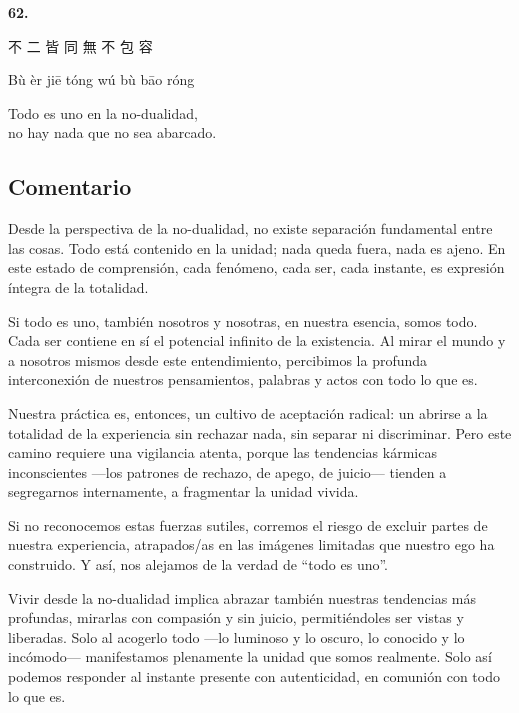 \documentclass[
  a5paperpaper,
]{article}
\begin{document}
\hfill\break

\hypertarget{02}{}
\begin{verseblock}

\newpage

\begin{center}\textbf{62.}\end{center}

不 二 皆 同 無 不 包 容

Bù èr jiē tóng wú bù bāo róng

Todo es uno en la no-dualidad,\\
no hay nada que no sea abarcado.

\end{verseblock}

\hfill\break

\hypertarget{comentario-61}{%
\subsection{Comentario}\label{comentario-61}}

Desde la perspectiva de la no-dualidad, no existe separación fundamental
entre las cosas. Todo está contenido en la unidad; nada queda fuera,
nada es ajeno. En este estado de comprensión, cada fenómeno, cada ser,
cada instante, es expresión íntegra de la totalidad.

Si todo es uno, también nosotros y nosotras, en nuestra esencia, somos
todo. Cada ser contiene en sí el potencial infinito de la existencia. Al
mirar el mundo y a nosotros mismos desde este entendimiento, percibimos
la profunda interconexión de nuestros pensamientos, palabras y actos con
todo lo que es.

Nuestra práctica es, entonces, un cultivo de aceptación radical: un
abrirse a la totalidad de la experiencia sin rechazar nada, sin separar
ni discriminar. Pero este camino requiere una vigilancia atenta, porque
las tendencias kármicas inconscientes ---los patrones de rechazo, de
apego, de juicio--- tienden a segregarnos internamente, a fragmentar la
unidad vivida.

Si no reconocemos estas fuerzas sutiles, corremos el riesgo de excluir
partes de nuestra experiencia, atrapados/as en las imágenes limitadas
que nuestro ego ha construido. Y así, nos alejamos de la verdad de
``todo es uno''.

Vivir desde la no-dualidad implica abrazar también nuestras tendencias
más profundas, mirarlas con compasión y sin juicio, permitiéndoles ser
vistas y liberadas. Solo al acogerlo todo ---lo luminoso y lo oscuro, lo
conocido y lo incómodo--- manifestamos plenamente la unidad que somos
realmente. Solo así podemos responder al instante presente con
autenticidad, en comunión con todo lo que es.
\end{document}

